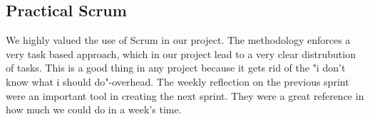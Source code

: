\documentclass[a4paper]{article}
\begin{document}
\subsection{Practical Scrum}
We highly valued the use of Scrum in our project. The methodology enforces a very task based approach, which in our project lead to a very clear distrubution of tasks. This is a good thing in any project because it gets rid of the "i don't know what i should do"-overhead. The weekly reflection on the previous sprint were an important tool in creating the next sprint. They were a great reference in how much we could do in a week's time.


\end{document}
